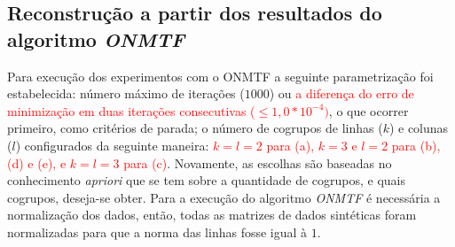\documentclass[
    12pt,                %
    oneside,            %
    a4paper,            %
    english,            %
    brazil                %
    ]{abntex2ppgsi}
\begin{document}


\subsection{Reconstrução a partir dos resultados do algoritmo \textit{ONMTF}}
\label{subsec:results-reconstruction-onmtf}


Para execução dos experimentos com o ONMTF a seguinte parametrização foi estabelecida: número máximo de iterações ($1000$) ou \textcolor{red}{a diferença do erro de minimização em duas iterações consecutivas ($\leq 1,0 * 10^{-4})$}, o que ocorrer primeiro, como critérios de parada; o número de cogrupos de linhas ($k$) e colunas ($l$) configurados da seguinte maneira: \textcolor{red}{$k = l = 2$ para (a), $k = 3$ e $l = 2$ para (b), (d) e (e), e $k = l = 3$ para (c)}. Novamente, as escolhas são baseadas no conhecimento \textit{apriori} que se tem sobre a quantidade de cogrupos, e quais cogrupos, deseja-se obter. Para a execução do algoritmo \textit{ONMTF} é necessária a normalização dos dados, então, todas as matrizes de dados sintéticas foram normalizadas para que a norma das linhas fosse igual à $1$. 
\end{document}
